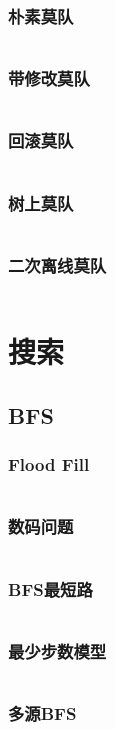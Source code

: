 \documentclass[a4paper,12pt]{article}
\begin{document}
\subsubsection{朴素莫队}
\inputminted[breaklines, linenos]{c++}{ds/mo.cc}
\subsubsection{带修改莫队}
\inputminted[breaklines, linenos]{c++}{ds/modify_mo.cc}
\subsubsection{回滚莫队}
\inputminted[breaklines, linenos]{c++}{ds/rollback_mo.cc}
\subsubsection{树上莫队}
\inputminted[breaklines, linenos]{c++}{ds/tree_mo.cc}
\subsubsection{二次离线莫队}
\inputminted[breaklines, linenos]{c++}{ds/offline_mo.cc}


\newpage  
\section{搜索}
\subsection{BFS}
\subsubsection{Flood Fill}
\inputminted[breaklines, linenos]{c++}{search/bfs/flood.cc}
\subsubsection{数码问题}
\inputminted[breaklines, linenos]{c++}{search/bfs/shuma.cc}
\subsubsection{BFS最短路}
\inputminted[breaklines, linenos]{c++}{search/bfs/path.cc}
\subsubsection{最少步数模型}
\inputminted[breaklines, linenos]{c++}{search/bfs/min_step.cc}
\subsubsection{多源BFS}
\inputminted[breaklines, linenos]{c++}{search/bfs/mul_source.cc}
\end{document}
